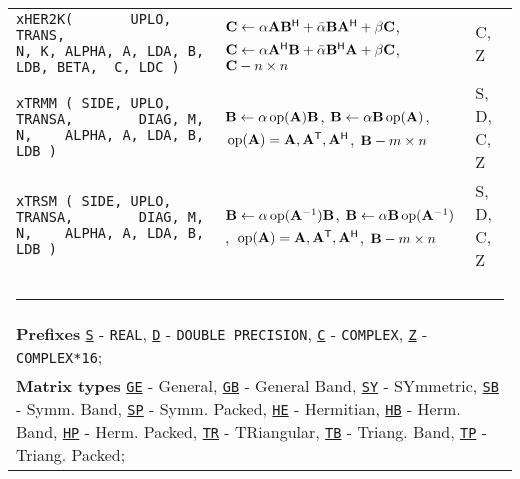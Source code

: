 \documentclass[10pt,a3paper, landscape]{article}
\newcommand{\T}{\mathsf{T}}
\renewcommand{\H}{\mathsf{H}}
\renewcommand{\op}{\,\mathrm{op}}
\newcommand{\key}[1]{\underline{\texttt{#1}}}
\begin{document}
\begin{tabular}{ll>{\ttfamily}l}
		\verb|xHER2K(       UPLO, TRANS,                  N, K, ALPHA, A, LDA, B, LDB, BETA,  C, LDC ) | & $\vb{C} \gets \alpha \vb{A}    \vb{B}^{\H}      +   \bar{\alpha} \vb{B} \vb{A}^{\H}   + \beta \vb{C} $, $\vb{C} \gets \alpha \vb{A}^{\H}    \vb{B}      +   \bar{\alpha} \vb{B}^{\H} \vb{A}   + \beta \vb{C} $,                        $\vb{C} - n \times n$ & C, Z               \\
		\verb|xTRMM ( SIDE, UPLO, TRANSA,        DIAG, M, N,    ALPHA, A, LDA, B, LDB )                | & $\vb{B} \gets \alpha \op(\vb{A})\vb{B}                                           $, $\vb{B} \gets \alpha \vb{B} \op(\vb{A})                                          $, $\op(\vb{A}) = \vb{A}, \vb{A}^{\T}, \vb{A}^{\H}$, $\vb{B} - m \times n$              & S, D, C, Z         \\
		\verb|xTRSM ( SIDE, UPLO, TRANSA,        DIAG, M, N,    ALPHA, A, LDA, B, LDB )                | & $\vb{B} \gets \alpha \op(\vb{A}^{-1}) \vb{B}                                     $, $\vb{B} \gets \alpha \vb{B} \op(\vb{A}^{-1})                                     $, $\op(\vb{A}) = \vb{A}, \vb{A}^{\T}, \vb{A}^{\H}$, $\vb{B} - m \times n$              & S, D, C, Z         \\
		                                                                                                 &                                                                                                                                                                                                                                                              &                    \\
		\multicolumn{3}{l}{\small\rule{2cm}{1pt}}                                                                                                                                                                                                                                                                                                                                            \\
		\multicolumn{3}{l}{\small\textbf{Prefixes}\; \key{S} - \texttt{REAL}, \key{D} - \texttt{DOUBLE PRECISION}, \key{C} - \texttt{COMPLEX}, \key{Z} - \texttt{COMPLEX*16};}                                                                                                                                                                                                               \\
		\multicolumn{3}{l}{\small\textbf{Matrix types}\; \key{GE} - General, \key{GB} - General Band, \key{SY} -  SYmmetric, \key{SB} - Symm. Band, \key{SP} - Symm. Packed, \key{HE} - Hermitian, \key{HB} - Herm. Band, \key{HP} - Herm. Packed, \key{TR} - TRiangular, \key{TB} - Triang. Band, \key{TP} - Triang. Packed;}                                                               \\

\end{tabular}
\end{document}
